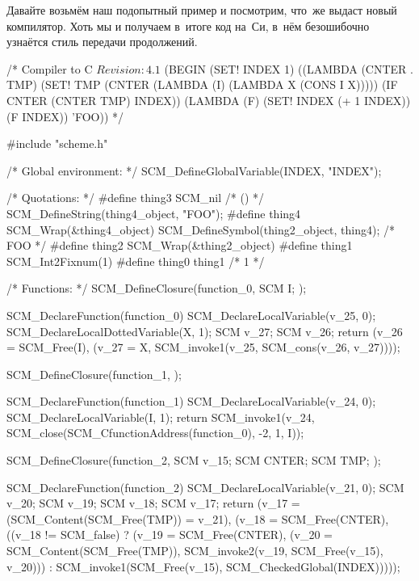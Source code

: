 Давайте возьмём наш подопытный пример и посмотрим, что~же выдаст новый
компилятор. Хоть мы и получаем в~итоге код на~Си, в~нём безошибочно узнаётся
стиль передачи продолжений.

\begin{code:c-frame}[title={\snippet{o/chap10kex.c}}, numbers=left,
    label=cc/call/cc/cc/example/src:subj]
/* Compiler to C $Revision: 4.1$
(BEGIN
  (SET! INDEX 1)
  ((LAMBDA
     (CNTER . TMP)
     (SET! TMP (CNTER (LAMBDA (I) (LAMBDA X (CONS I X)))))
     (IF CNTER (CNTER TMP) INDEX))
    (LAMBDA (F) (SET! INDEX (+ 1 INDEX)) (F INDEX))
    'FOO))
*/

#include "scheme.h"

/* Global environment: */
SCM_DefineGlobalVariable(INDEX, "INDEX");

/* Quotations: */
#define thing3 SCM_nil                      /* () */
SCM_DefineString(thing4_object, "FOO");
#define thing4 SCM_Wrap(&thing4_object)
SCM_DefineSymbol(thing2_object, thing4);    /* FOO */
#define thing2 SCM_Wrap(&thing2_object)
#define thing1 SCM_Int2Fixnum(1)
#define thing0 thing1                       /* 1 */

/* Functions: */
SCM_DefineClosure(function_0, SCM I; );

SCM_DeclareFunction(function_0)
{
    SCM_DeclareLocalVariable(v_25, 0);
    SCM_DeclareLocalDottedVariable(X, 1);
    SCM v_27; SCM v_26;
    return (v_26 = SCM_Free(I),
            (v_27 = X,
             SCM_invoke1(v_25,
                         SCM_cons(v_26, v_27))));
}

SCM_DefineClosure(function_1, );

SCM_DeclareFunction(function_1)
{
    SCM_DeclareLocalVariable(v_24, 0);
    SCM_DeclareLocalVariable(I, 1);
    return SCM_invoke1(v_24,
                       SCM_close(SCM_CfunctionAddress(function_0),
                                 -2, 1, I));
}

SCM_DefineClosure(function_2, SCM v_15; SCM CNTER; SCM TMP; );

SCM_DeclareFunction(function_2)
{
    SCM_DeclareLocalVariable(v_21, 0);
    SCM v_20; SCM v_19; SCM v_18; SCM v_17;
    return (v_17 = (SCM_Content(SCM_Free(TMP)) = v_21),
            (v_18 = SCM_Free(CNTER),
             ((v_18 != SCM_false)
              ? (v_19 = SCM_Free(CNTER),
                 (v_20 = SCM_Content(SCM_Free(TMP)),
                  SCM_invoke2(v_19,
                              SCM_Free(v_15),
                              v_20)))
              : SCM_invoke1(SCM_Free(v_15),
                            SCM_CheckedGlobal(INDEX)))));
}


\end{code:c-frame}
